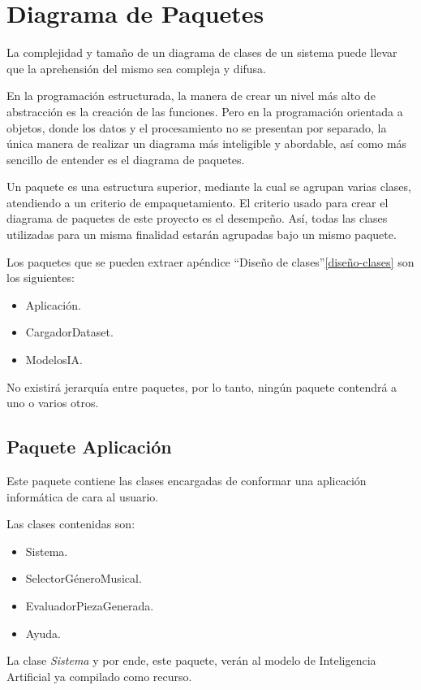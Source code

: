 
\chapter{Diagrama de Paquetes}

La complejidad y tamaño de un diagrama de clases de un sistema puede llevar que la aprehensión del mismo sea compleja y difusa.

En la programación estructurada, la manera de crear un nivel más alto de abstracción es la creación de las funciones. Pero en la programación orientada a objetos, donde los datos y el procesamiento no se presentan por separado, la única manera de realizar un diagrama más inteligible y abordable, así como más sencillo de entender es el diagrama de paquetes.

Un paquete es una estructura superior, mediante la cual se agrupan varias clases, atendiendo a un criterio de empaquetamiento. El criterio usado para crear el diagrama de paquetes de este proyecto es el desempeño. Así, todas las clases utilizadas para un misma finalidad estarán agrupadas bajo un mismo paquete.

Los paquetes que se pueden extraer apéndice ``Diseño de clases''\ref{diseño-clases} son los siguientes:

\begin{itemize}
    \item Aplicación.
    \item CargadorDataset.
    \item ModelosIA.
\end{itemize}

No existirá jerarquía entre paquetes, por lo tanto, ningún paquete contendrá a uno o varios otros.

\section{Paquete Aplicación}
Este paquete contiene las clases encargadas de conformar una aplicación informática de cara al usuario. 

Las clases contenidas son:

\begin{itemize}
  \item Sistema.
  \item SelectorGéneroMusical.
  \item EvaluadorPiezaGenerada.
  \item Ayuda.
\end{itemize}

La clase \emph{Sistema} y por ende, este paquete, verán al modelo de Inteligencia Artificial ya compilado como recurso.

